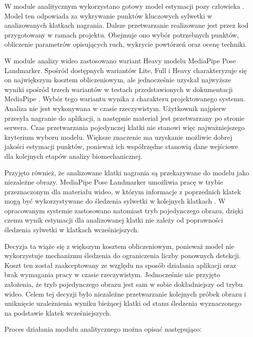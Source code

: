 W module analitycznym wykorzystano gotowy model estymacji pozy człowieka \cite{mediapipe_pose_landmarker}. Model ten odpowiada za wykrywanie punktów kluczowych sylwetki w analizowanych klatkach nagrania. Dalsze przetwarzanie realizowane jest przez kod przygotowany w ramach projektu. Obejmuje ono wybór potrzebnych punktów, obliczenie parametrów opisujących ruch, wykrycie powtórzeń oraz ocenę techniki.

W module analizy wideo zastosowano wariant Heavy modelu MediaPipe Pose Landmarker. Spośród dostępnych wariantów Lite, Full i Heavy charakteryzuje się on największym kosztem obliczeniowym, ale jednocześnie uzyskał najwyższe wyniki spośród trzech wariantów w testach przedstawionych w dokumentacji MediaPipe \cite{mediapipe_pose_docs}. Wybór tego wariantu wynika z charakteru projektowanego systemu. Analiza nie jest wykonywana w czasie rzeczywistym. Użytkownik najpierw przesyła nagranie do aplikacji, a następnie materiał jest przetwarzany po stronie serwera. Czas przetwarzania pojedynczej klatki nie stanowi więc najważniejszego kryterium wyboru modelu. Większe znaczenie ma uzyskanie możliwie dobrej jakości estymacji punktów, ponieważ ich współrzędne stanowią dane wejściowe dla kolejnych etapów analizy biomechanicznej.

Przyjęto również, że analizowane klatki nagrania są przekazywane do modelu jako niezależne obrazy. MediaPipe Pose Landmarker umożliwia pracę w trybie przeznaczonym dla materiału wideo, w którym informacje z poprzednich klatek mogą być wykorzystywane do śledzenia sylwetki w kolejnych klatkach \cite{mediapipe_pose_landmarker,bazarevsky2020blazepose}. W opracowanym systemie zastosowano natomiast tryb pojedynczego obrazu, dzięki czemu wynik estymacji dla analizowanej klatki nie zależy od poprawności śledzenia sylwetki w klatkach wcześniejszych.

Decyzja ta wiąże się z większym kosztem obliczeniowym, ponieważ model nie wykorzystuje mechanizmu śledzenia do ograniczenia liczby ponownych detekcji. Koszt ten został zaakceptowany ze względu na sposób działania aplikacji oraz brak wymagania pracy w czasie rzeczywistym. Jednocześnie nie przyjęto założenia, że tryb pojedynczego obrazu jest sam w sobie dokładniejszy od trybu wideo. Celem tej decyzji było niezależne przetwarzanie kolejnych próbek obrazu i uniknięcie uzależnienia wyniku bieżącej klatki od stanu śledzenia wyznaczonego na podstawie klatek wcześniejszych.

Proces działania modułu analitycznego można opisać następująco:

